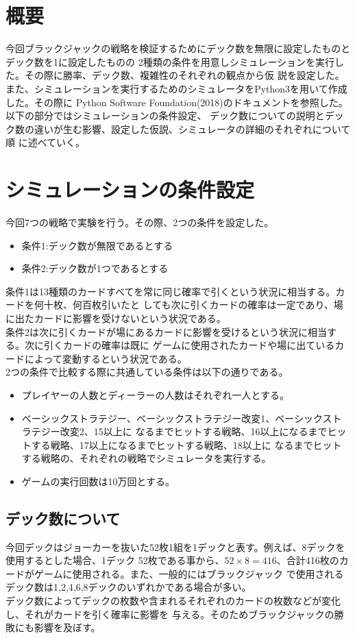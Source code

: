 \section{概要}
今回ブラックジャックの戦略を検証するためにデック数を無限に設定したものとデック数を1に設定したものの
2種類の条件を用意しシミュレーションを実行した。その際に勝率、デック数、複雑性のそれぞれの観点から仮
説を設定した。また、シミュレーションを実行するためのシミュレータをPython3を用いて作成した。その際に
Python Software Foundation(2018)のドキュメントを参照した。以下の部分ではシミュレーションの条件設定、
デック数についての説明とデック数の違いが生む影響、設定した仮説、シミュレータの詳細のそれぞれについて順
に述べていく。

\section{シミュレーションの条件設定}
今回7つの戦略で実験を行う。その際、2つの条件を設定した。
\begin{itemize}
\item 条件1:デック数が無限であるとする
\item 条件2:デック数が1つであるとする
\end{itemize}
条件1は13種類のカードすべてを常に同じ確率で引くという状況に相当する。カードを何十枚、何百枚引いたと
しても次に引くカードの確率は一定であり、場に出たカードに影響を受けないという状況である。\\
条件2は次に引くカードが場にあるカードに影響を受けるという状況に相当する。次に引くカードの確率は既に
ゲームに使用されたカードや場に出ているカードによって変動するという状況である。\\
2つの条件で比較する際に共通している条件は以下の通りである。
\begin{itemize}
\item プレイヤーの人数とディーラーの人数はそれぞれ一人とする。
\item ベーシックストラテジー、ベーシックストラテジー改変1、ベーシックストラテジー改変2、15以上に
なるまでヒットする戦略、16以上になるまでヒットする戦略、17以上になるまでヒットする戦略、18以上に
なるまでヒットする戦略の、それぞれの戦略でシミュレータを実行する。
\item ゲームの実行回数は10万回とする。
\end{itemize}

\subsection{デック数について}
今回デックはジョーカーを抜いた52枚1組を1デックと表す。例えば、8デックを使用するとした場合、1デック
52枚である事から、$52×8=416$、合計416枚のカードがゲームに使用される。また、一般的にはブラックジャック
で使用されるデック数は1,2,4,6,8デックのいずれかである場合が多い。\\
デック数によってデックの枚数や含まれるそれぞれのカードの枚数などが変化し、それがカードを引く確率に影響を
与える。そのためブラックジャックの勝敗にも影響を及ぼす。


